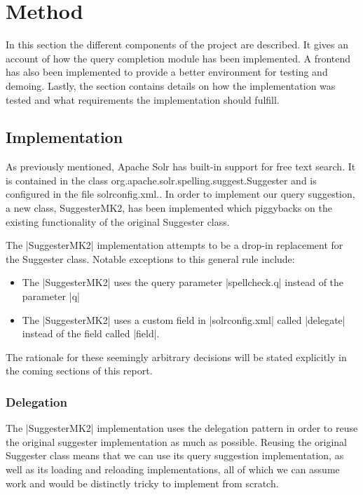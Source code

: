 \section{Method}\label{method}

In this section the different components of the project are described. It gives an account of how the query completion module has been implemented. A frontend has also been implemented to provide a better environment for testing and demoing. Lastly, the section contains details on how the implementation was tested and what requirements the implementation should fulfill. 

\subsection{Implementation}

As previously mentioned, Apache Solr has built-in support for free text search. It is contained in the class org.apache.solr.spelling.suggest.Suggester and is configured in the file solrconfig.xml.. In order to implement our query suggestion, a new class, SuggesterMK2, has been implemented which piggybacks on the existing functionality of the original Suggester class.\cite{SUGGESTER}

The |SuggesterMK2| implementation attempts to be a drop-in replacement for the Suggester class. Notable exceptions to this general rule include:
\begin{itemize}

\item The |SuggesterMK2| uses the query parameter |spellcheck.q| instead of the parameter |q|
\item The |SuggesterMK2| uses a custom field in |solrconfig.xml| called |delegate| instead of the field called |field|.
\end{itemize}

The rationale for these seemingly arbitrary decisions will be stated explicitly in the coming sections of this report.

\subsubsection{Delegation}

The |SuggesterMK2| implementation uses the delegation pattern\cite{DELEGATE} in order to reuse the original suggester implementation as much as possible. Reusing the original Suggester class means that we can use its query suggestion implementation, as well as its loading and reloading implementations, all of which we can assume work and would be distinctly tricky to implement from scratch.

